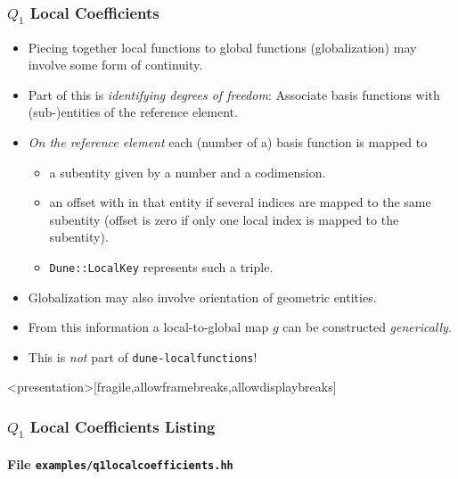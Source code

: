 \begin{frame}
\frametitle{$Q_1$ Local Coefficients}
\begin{itemize}
\item Piecing together local functions to global functions (globalization)
may involve some form of continuity.
\item Part of this is \textit{identifying degrees of freedom}:
Associate basis functions with 
(sub-)entities of the reference element.
\item \textit{On the reference element} each (number of a) basis function is 
mapped to
\begin{itemize}
\item a subentity given by a number and a codimension.
\item an offset with in that entity if several indices are mapped to
the same subentity (offset is zero if only one local index is mapped
to the subentity). 
\item \lstinline{Dune::LocalKey} represents such a triple.
\end{itemize} 
\item Globalization may also involve orientation of geometric entities.
\item From this information a local-to-global map $g$ can be
constructed \textit{generically}. 
\item This is \textit{not} part of \lstinline{dune-localfunctions}!
\end{itemize}
\end{frame}

\begin{frame}<presentation>[fragile,allowframebreaks,allowdisplaybreaks]
\frametitle<presentation>{$Q_1$ Local Coefficients Listing}
\framesubtitle<presentation>{File \texttt{examples/q1localcoefficients.hh}}

\end{frame}


